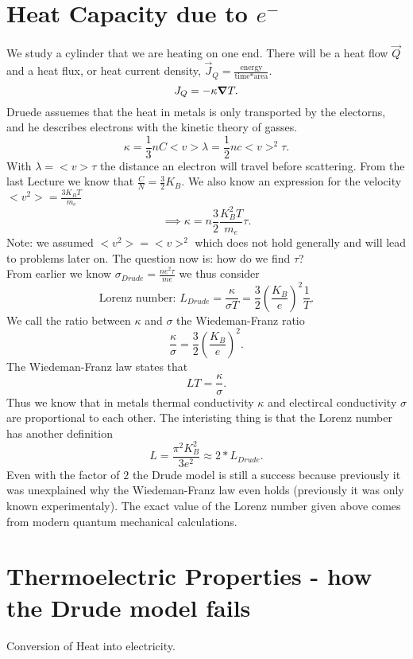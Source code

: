 \documentclass{report}
\begin{document}
\section{Heat Capacity due to $e^-$}
We study a cylinder that we are heating on one end. There will be a heat flow $\vec{Q}$ and a heat flux, or heat current density, $\vec{J}_Q = \frac{\text{energy}}{\text{time} * \text{area}}$.\[
J_Q = - \kappa \grad T
.\] Druede assuemes that the heat in metals is only transported by the electorns, and he describes electrons with the kinetic theory of gasses. \[
\kappa = \frac{1}{3} n C <v> \lambda = \frac{1}{2} n c <v>^2 \tau
.\] With $\lambda = <v> \tau$ the distance an electron will travel before scattering. From the last Lecture we know that $\frac{C}{N}= \frac{3}{2} K_B$. We also know an expression for the velocity $<v^2> = \frac{3K_BT}{m_e}$ \[
\implies \kappa = n \frac{3}{2} \frac{K_B^2T}{m_e} \tau
.\] Note: we assumed $<v^2> = <v>^2$ which does not hold generally and will lead to problems later on. The question now is: how do we find $\tau$?\\
From earlier we know $\sigma_{Drude} = \frac{ne^2\tau}{me}$ we thus consider \[
	\text{Lorenz number: } L_{Drude} = \frac{\kappa}{\sigma T} = \frac{3}{2} \left( \frac{K_B}{e} \right)^2 \frac{1}{T}
.\] We call the ratio between $\kappa$ and $\sigma$ the Wiedeman-Franz ratio \[
\frac{\kappa}{\sigma} = \frac{3}{2} \left( \frac{K_B}{e} \right) ^2
.\] The Wiedeman-Franz law states that \[
LT = \frac{\kappa}{\sigma}
.\] Thus we know that in metals thermal conductivity $\kappa$ and electircal conductivity $\sigma$ are proportional to each other. The interisting thing is that the Lorenz number has another definition \[
L = \frac{\pi^2 K_B^2}{3 e^2} \approx 2*L_{Drude}
.\] Even with the factor of $2$ the Drude model is still a success because previously it was unexplained why the Wiedeman-Franz law even holds (previously it was only known experimentaly). The exact value of the Lorenz number given above comes from modern quantum mechanical calculations.
\section{Thermoelectric Properties - how the Drude model fails}
Conversion of Heat into electricity.
\end{document}
